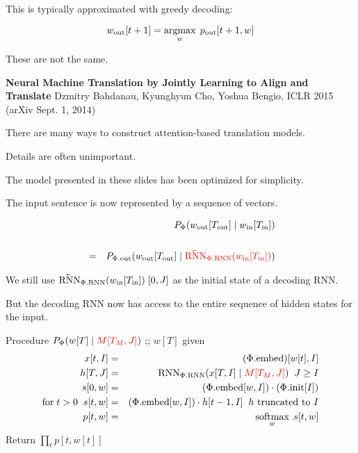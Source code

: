 {\vfill
This is typically approximated with greedy decoding:

\vfill
$$w_{\mathrm{out}}[t+1] = \operatorname*{argmax}_w\; p_{\mathrm{out}}[t+1,w]$$

\vfill
These are not the same.


{\bf Neural Machine Translation by Jointly Learning to Align and Translate}
Dzmitry Bahdanau, Kyunghyun Cho, Yoshua Bengio, ICLR 2015 (arXiv Sept. 1, 2014)

\vfill
There are many ways to construct attention-based translation models.

\vfill
Details are often unimportant.

\vfill
The model presented in these slides has been optimized for simplicity.



The input sentence is now represented by a sequence of vectors.

\vfill
\begin{eqnarray*}
 & & P_\Phi(w_{\mathrm{out}}[T_{\mathrm{out}}] \;|\; w_{\mathrm{in}}[T_{\mathrm{in}}]) \\
 \\
& = & P_{\Phi.\mathrm{out}}(w_{\mathrm{out}}[T_{\mathrm{out}}]\;|\;
{\color{red} \cev{\mathrm{RNN}}_{\Phi.\mathrm{RNN}}(w_{\mathrm{in}}[T_{\mathrm{in}}])})
\end{eqnarray*}

\vfill
We still use {\color{red} $\cev{\mathrm{RNN}}_{\Phi.\mathrm{RNN}}(w_{\mathrm{in}}[T_{\mathrm{in}}])\;[0,J]$} as the initial state of a decoding RNN.

\vfill
But the decoding RNN now has access to the entire sequence of hidden states for the input.


Procedure $P_\Phi(w[T] \;|\; {\color{red} M[T_M,J]})$ ;;{\color{red} $w[T]$ given}
{\huge \begin{eqnarray*}
x[t,I] & = & (\Phi.\mathrm{embed})[w[t],I] \\
h[T,J] & = & \mathrm{RNN}_{\Phi.\mathrm{RNN}}(x[T,I] \;|\;{\color{red} M[T_M,J]})\;\;J \geq I \\
s[0,w] & = & (\Phi.\mathrm{embed}[w,I])\cdot (\Phi.\mathrm{init}[I]) \\
\mathrm{for}\;t > 0\;\;s[t,w] & = & (\Phi.\mathrm{embed}[w,I]) \cdot h[t-1,I] \;\;\mbox{$h$ truncated to $I$}\\
p[t,w] & = & \operatorname*{softmax}_w\;s[t,w]
\end{eqnarray*}
}
Return $\prod_t p[t,w[t]]$

}
